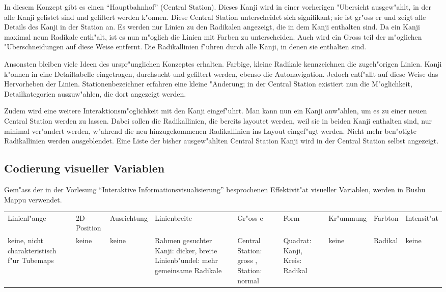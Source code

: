 In diesem Konzept gibt es einen "`Hauptbahnhof"' (Central Station). Dieses Kanji wird in einer vorherigen "Ubersicht ausgew"ahlt, in der alle Kanji gelistet sind und gefiltert werden k"onnen. Diese Central Station unterscheidet sich signifikant; sie ist gr"oss er und zeigt alle Details des Kanji in der Station an. Es werden nur Linien zu den Radikalen angezeigt, die in dem Kanji enthalten sind. Da ein Kanji maximal neun Radikale enth"alt, ist es nun m"oglich die Linien mit Farben zu unterscheiden. Auch wird ein Gross teil der m"oglichen "Uberschneidungen auf diese Weise entfernt. Die Radikallinien f"uhren durch alle Kanji, in denen sie enthalten sind.

Ansonsten bleiben viele Ideen des urspr"unglichen Konzeptes erhalten. Farbige, kleine Radikale kennzeichnen die zugeh"origen Linien. Kanji k"onnen in eine Detailtabelle eingetragen, durchsucht und gefiltert werden, ebenso die Autonavigation. Jedoch entf"allt auf diese Weise das Hervorheben der Linien. Stationenbezeichner erfahren eine kleine "Anderung; in der Central Station existiert nun die M"oglichkeit, Detailkategorien auszuw"ahlen, die dort angezeigt werden. 

Zudem wird eine weitere Interaktionsm"oglichkeit mit den Kanji eingef"uhrt. Man kann nun ein Kanji anw"ahlen, um es zu einer neuen Central Station werden zu lassen. Dabei sollen die Radikallinien, die bereits layoutet werden, weil sie in beiden Kanji enthalten sind, nur minimal ver"andert werden, w"ahrend die neu hinzugekommenen Radikallinien ins Layout eingef"ugt werden. Nicht mehr ben"otigte Radikallinien werden ausgeblendet. Eine Liste der bisher ausgew"ahlten Central Station Kanji wird in der Central Station selbst angezeigt.

\subsection{Codierung visueller Variablen}
Gem"ass  der in der Vorlesung "`Interaktive Informationsvisualisierung"' besprochenen Effektivit"at visueller Variablen, werden in Bushu Mappu verwendet. 

\begin{table}[h]
\begin{tabular}{lllllllll}

Linienl"ange                                & 2D-Position & Ausrichtung & Linienbreite                                                                  & Gr"oss e                                  & Form                           & Kr"ummung & Farbton & Intensit"at \\
keine, nicht charakteristisch f"ur Tubemaps & keine       & keine       & Rahmen gesuchter Kanji: dicker, breite Linienb"undel: mehr gemeinsame Radikale & Central Station: gross , Station: normal & Quadrat: Kanji, Kreis: Radikal & keine    & Radikal & keine      \\
\end{tabular}
\end{table}

